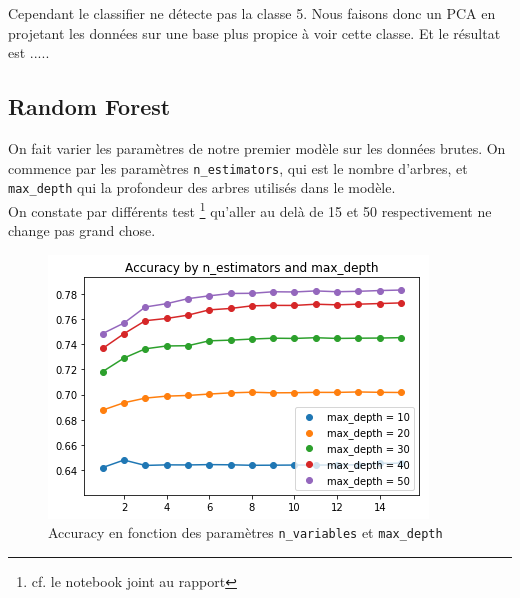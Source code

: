 \documentclass[12pt,a4paper]{article}
\numberwithin{equation}{section}
\begin{document}
	Cependant le classifier ne détecte pas la classe 5. Nous faisons donc un PCA en projetant les données sur une base plus propice à voir cette classe. Et le résultat est ..... \\
	

	\newpage
	
	\subsection{Random Forest}
	
	On fait varier les paramètres de notre premier modèle sur les données brutes. On commence par les paramètres \texttt{n\_estimators}, qui est le nombre d'arbres, et \texttt{max\_depth} qui la profondeur des arbres utilisés dans le modèle.\\ On constate par différents test \footnote{cf. le notebook joint au rapport} qu'aller au delà de 15 et 50 respectivement ne change pas grand chose. 
	
	\begin{figure}[h]
		\centering
		\includegraphics[width=0.7\linewidth]{img/random_forest_accuracy}
		\caption{Accuracy en fonction des paramètres \texttt{n\_variables}  et \texttt{max\_depth}}
		\label{fig:randomforestaccuracy1}
	\end{figure}
	

	
	
	
	
	
\end{document}

